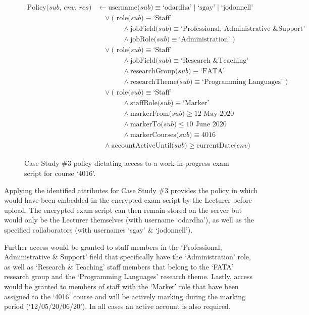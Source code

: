 \begin{figure}[ht]
  \centering
\begin{align*}
  \text{Policy($sub$, $env$, $res$)}
  &
    \leftarrow
    \text{username($sub$)} \equiv \text{`odardha'} \mid \text{`sgay'} \mid \text{`jodonnell'}
  \\
  &
    \phantom{::}\vee
    \text{( role($sub$)} \equiv \text{`Staff'}
  \\
  &
    \phantom{::::::::}\wedge
    \text{jobField($sub$)} \equiv \text{`Professional, Administrative \& Support'}
  \\
  &
    \phantom{::::::::}\wedge
    \text{jobRole($sub$)} \equiv \text{`Administration' )}
  \\
  &
    \phantom{::}\vee
    \text{( role($sub$)} \equiv \text{`Staff'}
  \\
  &
    \phantom{::::::::}\wedge
    \text{jobField($sub$)} \equiv \text{`Research \& Teaching'}
  \\
  &
    \phantom{::::::::}\wedge
    \text{researchGroup($sub$)} \equiv \text{`FATA'}
  \\
  &
    \phantom{::::::::}\wedge
    \text{researchTheme($sub$)} \equiv \text{`Programming Languages' )}
  \\
  &
    \phantom{::}\vee
    \text{( role($sub$)} \equiv \text{`Staff'}
  \\
  &
    \phantom{::::::::}\wedge
    \text{staffRole($sub$)} \equiv \text{`Marker'}
  \\
  &
    \phantom{::::::::}\wedge
    \text{markerFrom($sub$)} \geq \text{12 May 2020}
  \\
  &
    \phantom{::::::::}\wedge
    \text{markerTo($sub$)} \leq \text{10 June 2020}
  \\
  &
    \phantom{::::::::}\wedge
    \text{markerCourses($sub$)} \equiv \text{4016}
  \\
  &
    \phantom{::}\wedge
    \text{accountActiveUntil($sub$)} \geq \text{currentDate($env$)}
\end{align*}
  \caption{
    \label{fig:case_study_policy_3}
    Case Study \#3 policy dictating access to a work-in-progress exam script for course `4016'.
  }
\end{figure}
Applying the identified attributes for Case Study \#3 provides the policy in  which would have been embedded in the encrypted exam script by the Lecturer before upload. The encrypted exam script can then remain stored on the server but would only be the Lecturer themselves (with username `odardha'), as well as the specified collaborators (with usernames `sgay' \& `jodonnell').

Further access would be granted to staff members in the `Professional, Administrative \& Support' field that specifically have the `Administration' role, as well as `Research \& Teaching' staff members that belong to the `FATA' research group and the `Programming Languages' research theme. Lastly, access would be granted to members of staff with the `Marker' role that have been assigned to the `4016' course and will be actively marking during the marking period (`12/05/20/06/20'). In all cases an active account is also required.
